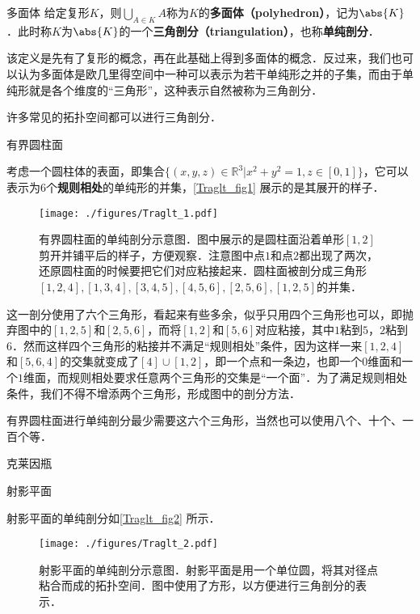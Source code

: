 

\begin{definition}{多面体}
给定复形$K$，则$\bigcup\limits_{A\in K}A$称为$K$的\textbf{多面体（polyhedron）}，记为$\abs{K}$．此时称$K$为$\abs{K}$的一个\textbf{三角剖分（triangulation）}，也称\textbf{单纯剖分}．
\end{definition}

该定义是先有了复形的概念，再在此基础上得到多面体的概念．反过来，我们也可以认为多面体是欧几里得空间中一种可以表示为若干单纯形之并的子集，而由于单纯形就是各个维度的“三角形”，这种表示自然被称为三角剖分．

许多常见的拓扑空间都可以进行三角剖分．

\begin{example}{有界圆柱面}

考虑一个圆柱体的表面，即集合$\{(x, y, z)\in\mathbb{R}^3|x^2+y^2=1, z\in [0, 1]\}$，它可以表示为$6$个\textbf{规则相处}的单纯形的并集，\autoref{Traglt_fig1} 展示的是其展开的样子．


\begin{figure}[ht]
\centering
\texttt{[image: ./figures/Traglt\_1.pdf]}
\caption{有界圆柱面的单纯剖分示意图．图中展示的是圆柱面沿着单形$[1, 2]$剪开并铺平后的样子，方便观察．注意图中点$1$和点$2$都出现了两次，还原圆柱面的时候要把它们对应粘接起来．圆柱面被剖分成三角形$[1,2,4], [1,3,4], [3,4,5], [4,5,6], [2,5,6], [1,2,5]$的并集．} \label{Traglt_fig1}
\end{figure}


这一剖分使用了六个三角形，看起来有些多余，似乎只用四个三角形也可以，即抛弃图中的$[1,2,5]$和$[2,5,6]$，而将$[1, 2]$和$[5, 6]$对应粘接，其中$1$粘到$5$，$2$粘到$6$．然而这样四个三角形的粘接并不满足“规则相处”条件，因为这样一来$[1, 2, 4]$和$[5, 6, 4]$的交集就变成了$[4]\cup[1, 2]$，即一个点和一条边，也即一个$0$维面和一个$1$维面，而规则相处要求任意两个三角形的交集是“一个面”．为了满足规则相处条件，我们不得不增添两个三角形，形成图中的剖分方法．



有界圆柱面进行单纯剖分最少需要这六个三角形，当然也可以使用八个、十个、一百个等．

\end{example}


\begin{example}{克莱因瓶}



\end{example}




\begin{example}{射影平面}

射影平面的单纯剖分如\autoref{Traglt_fig2} 所示．

\begin{figure}[ht]
\centering
\texttt{[image: ./figures/Traglt\_2.pdf]}
\caption{射影平面的单纯剖分示意图．射影平面是用一个单位圆，将其对径点粘合而成的拓扑空间．图中使用了方形，以方便进行三角剖分的表示．} \label{Traglt_fig2}
\end{figure}

\end{example}








